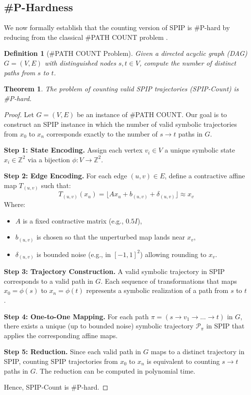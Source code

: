 \documentclass[twocolumn,10pt]{article}
\newtheorem{definition}{Definition}
\newtheorem{theorem}{Theorem}
\renewcommand{\qedsymbol}{}  %
\begin{document}
\subsection{\#P-Hardness}

We now formally establish that the counting version of SPIP is \#P-hard by reducing from the classical \#PATH COUNT problem \cite{valiant1979complexity, sipser1996introduction}.

\begin{definition}[\#PATH COUNT Problem]
Given a directed acyclic graph (DAG) $G = (V, E)$ with distinguished nodes $s, t \in V$, compute the number of distinct paths from $s$ to $t$.
\end{definition}

\begin{theorem}
The problem of counting valid SPIP trajectories (SPIP-Count) is \#P-hard.
\end{theorem}

\begin{proof}
Let $G = (V, E)$ be an instance of \#PATH COUNT. Our goal is to construct an SPIP instance in which the number of valid symbolic trajectories from $x_0$ to $x_n$ corresponds exactly to the number of $s \rightarrow t$ paths in $G$.

\textbf{Step 1: State Encoding.} Assign each vertex $v_i \in V$ a unique symbolic state $x_i \in \mathbb{Z}^2$ via a bijection $\phi: V \rightarrow \mathbb{Z}^2$.

\textbf{Step 2: Edge Encoding.} For each edge $(u,v) \in E$, define a contractive affine map $T_{(u,v)}$ such that:
\[
T_{(u,v)}(x_u) = \lfloor A x_u + b_{(u,v)} + \delta_{(u,v)} \rfloor \approx x_v
\]
Where:
\begin{itemize}
    \item $A$ is a fixed contractive matrix (e.g., $0.5I$),
    \item $b_{(u,v)}$ is chosen so that the unperturbed map lands near $x_v$,
    \item $\delta_{(u,v)}$ is bounded noise (e.g., in $[-1,1]^2$) allowing rounding to $x_v$.
\end{itemize}

\textbf{Step 3: Trajectory Construction.} A valid symbolic trajectory in SPIP corresponds to a valid path in $G$. Each sequence of transformations that maps $x_0 = \phi(s)$ to $x_n = \phi(t)$ represents a symbolic realization of a path from $s$ to $t$.

\textbf{Step 4: One-to-One Mapping.} For each path $\pi = (s \rightarrow v_1 \rightarrow \dots \rightarrow t)$ in $G$, there exists a unique (up to bounded noise) symbolic trajectory $\mathcal{P}_\pi$ in SPIP that applies the corresponding affine maps.

\textbf{Step 5: Reduction.} Since each valid path in $G$ maps to a distinct trajectory in SPIP, counting SPIP trajectories from $x_0$ to $x_n$ is equivalent to counting $s \rightarrow t$ paths in $G$. The reduction can be computed in polynomial time.

Hence, SPIP-Count is \#P-hard. \renewcommand{\qedsymbol}{}
\end{proof}
\end{document}
